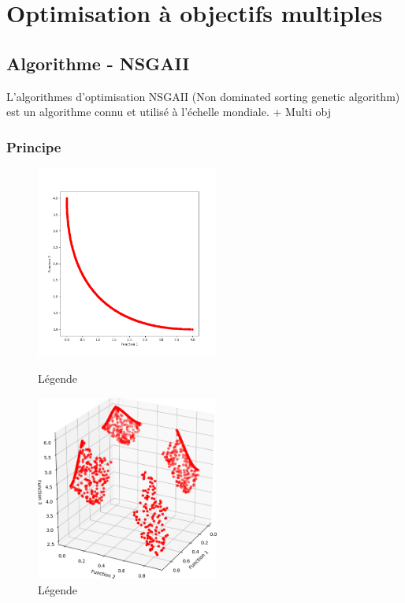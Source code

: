 \documentclass[12pt]{report}
\begin{document}
  \chapter{Optimisation à objectifs multiples}
    \section{Algorithme - NSGAII}
    L'algorithmes d'optimisation NSGAII (Non dominated sorting genetic algorithm) est un algorithme connu et utilisé à l'échelle mondiale.
    + Multi obj
      \subsection{Principe}
      \begin{figure}[h]
        \begin{minipage}[c]{.46\linewidth}
            \centering
            \includegraphics[width=6cm]{img/4,1,1_Pareto_uni.png}
            \caption{Légende}
        \end{minipage}
        \hfill%
        \begin{minipage}[c]{.46\linewidth}
            \centering
            \includegraphics[width=6cm]{img/4,1,1_Pareto.png}
            \caption{Légende}
        \end{minipage}
      \end{figure}
\end{document}
